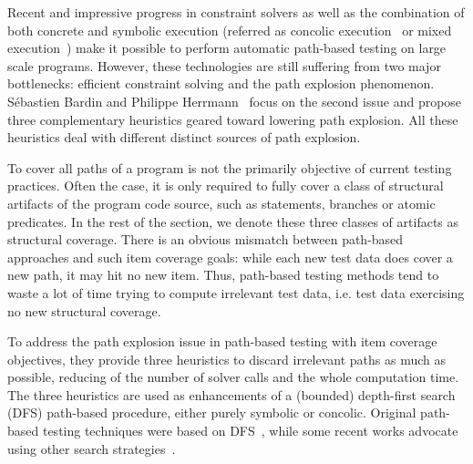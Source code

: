 Recent and impressive progress in constraint solvers as well as the combination of both concrete and symbolic execution (referred as concolic execution~\cite{cute,compositional} or mixed execution~\cite{mixed}) make it possible to perform automatic path-based testing on large scale programs. However, these technologies are still suffering from two major bottlenecks: efficient constraint solving and the path explosion phenomenon. S\'{e}bastien Bardin and Philippe Herrmann~\cite{prune} focus on the second issue and propose three complementary heuristics geared toward lowering path explosion. All these heuristics deal with different distinct sources of path explosion. 

To cover all paths of a program is not the primarily objective of current testing practices. Often the case, it is only required to fully cover a class of structural artifacts of the program code source, such as statements, branches or atomic predicates. In the rest of the section, we denote these three classes of artifacts as structural coverage. There is an obvious mismatch between path-based approaches and such item coverage goals: while each new test data does cover a new path, it may hit no new item. Thus, path-based testing methods tend to waste a lot of time trying to compute irrelevant test data, i.e. test data exercising no new structural coverage. 

To address the path explosion issue in path-based testing with item coverage objectives, they provide three heuristics to discard irrelevant paths as much as possible, reducing of the number of solver calls and the whole computation time. The three heuristics are used as enhancements of a (bounded) depth-first search (DFS) path-based procedure, either purely symbolic or concolic. Original path-based testing techniques were based on DFS~\cite{dart,cute, onthefly}, while some recent works advocate using other search strategies~\cite{exe,hybrid,fuzz}.

